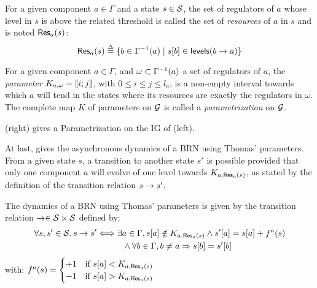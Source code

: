 \begin{definition}\label{def:resources}
For a given component $a \in \Gamma$ and a state $s \in \mathcal{S}$,
the set of regulators of $a$ whose level in $s$ is above the related threshold %
is called the set of \emph{resources} of $a$ in $s$ and is noted $\mathsf{Res}_{a}(s)$:
$$\mathsf{Res}_{a}(s) \stackrel{\Delta}= \{ b \in \Gamma^{-1}(a) \mid {s[b]} \in \mathsf{levels}(b\rightarrow a) \}$$
\end{definition}

\begin{definition}\label{def:param}
For a given component $a \in \Gamma$, and $\omega \subset \Gamma^{-1}(a)$ a set of regulators of $a$,
the \emph{parameter} $K_{a,\omega} = \llbracket i ; j \rrbracket$, with $0 \leq i \leq j \leq l_a$, is a non-empty interval towards which $a$ will tend
in the states where its resources are exactly the regulators in $\omega$.
The complete map $K$ of parameters on $\mathcal{G}$ is called a \emph{parametrization} on $\mathcal{G}$.
\end{definition}

\begin{example*}
(right) gives a Parametrization on the IG of (left).
\end{example*}

At last,  gives the asynchronous dynamics of a BRN using Thomas' parameters.
From a given state $s$, a transition to another state $s'$ is possible provided that only one component $a$ will evolve of one level towards $K_{a,\mathsf{Res}_{a}(s)}$,
as stated by the definition of the transition relation $s \rightarrow s'$.

\begin{definition}\label{def:dynamics}
The dynamics of a BRN using Thomas' parameters is given by the transition relation $\rightarrow \in \mathcal{S} \times \mathcal{S}$ defined by:
\begin{align*}
  \forall s, s' \in \mathcal{S}, s \rightarrow s' &\Longleftrightarrow \exists a \in \Gamma, {s[a]} \notin K_{a, \mathsf{Res}_{a}(s)} \wedge {s'[a]} = {s[a]} + f^a(s) \\
    & \qquad\quad \wedge \forall b \in \Gamma, b \neq a \Rightarrow {s[b]} = {s'[b]}
\end{align*}
with: $f^a(s) = 
  \begin{cases}
    +1 & \text{if } {s[a]} < K_{a, \mathsf{Res}_{a}(s)} \\
    -1 & \text{if } {s[a]} > K_{a, \mathsf{Res}_{a}(s)} \\
  \end{cases}$
\end{definition}

